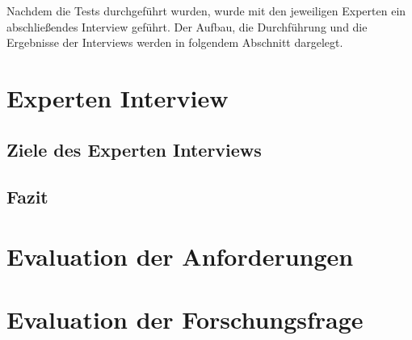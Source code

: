         
        Nachdem die Tests durchgeführt wurden, wurde 
        mit den jeweiligen Experten ein abschließendes Interview geführt. Der Aufbau, die Durchführung und die Ergebnisse der Interviews 
        werden in folgendem Abschnitt dargelegt.

\section{Experten Interview}
    \subsection{Ziele des Experten Interviews}
    \subsection{Fazit}

\section{Evaluation der Anforderungen}

\section{Evaluation der Forschungsfrage}